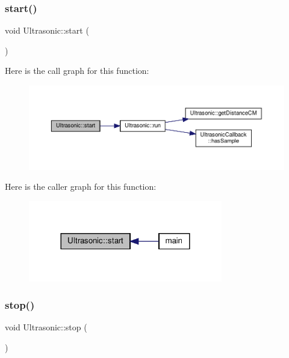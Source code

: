 \subsubsection{\texorpdfstring{start()}{start()}}
{\footnotesize\ttfamily void Ultrasonic\+::start (\begin{DoxyParamCaption}{ }\end{DoxyParamCaption})}

Here is the call graph for this function\+:
\nopagebreak
\begin{figure}[H]
\begin{center}
\leavevmode
\includegraphics[width=350pt]{classUltrasonic_aa0ede289109954e5b3c713bbebe8c8e1_cgraph}
\end{center}
\end{figure}
Here is the caller graph for this function\+:
\nopagebreak
\begin{figure}[H]
\begin{center}
\leavevmode
\includegraphics[width=240pt]{classUltrasonic_aa0ede289109954e5b3c713bbebe8c8e1_icgraph}
\end{center}
\end{figure}
\mbox{\label{classUltrasonic_ae5d433dfce8572b5cc1d75a909ae2c1c}} 
\subsubsection{\texorpdfstring{stop()}{stop()}}
{\footnotesize\ttfamily void Ultrasonic\+::stop (\begin{DoxyParamCaption}{ }\end{DoxyParamCaption})}

